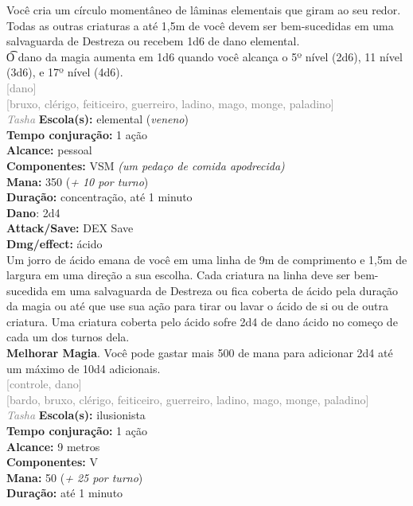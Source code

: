 \documentclass{RPG_Adventure}[2021/10/20]
\begin{document}
{\normalsize Você cria um círculo momentâneo de lâminas elementais que giram ao seu redor. Todas as outras criaturas a até 1,5m de você devem ser bem-sucedidas em uma salvaguarda de Destreza ou recebem 1d6 de dano elemental.\\\t O dano da magia aumenta em 1d6 quando você alcança o 5º nível (2d6), 11 nível (3d6), e 17º nível (4d6).\\}
{\scriptsize \textcolor{gray}{[dano]\\}}
{\scriptsize \textcolor{gray}{[bruxo, clérigo, feiticeiro, guerreiro, ladino, mago, monge, paladino]\\}}
{\tiny \textcolor{gray}{\textit{Tasha}}}
{\small \t \textbf{Escola(s):} elemental (\textit{veneno})\\\t \textbf{Tempo conjuração:} 1 ação\\\t \textbf{Alcance:} pessoal\\\t \textbf{Componentes:} VSM \textit{(um pedaço de comida apodrecida)}\\\t \textbf{Mana:} 350 (\textit{+ 10 por turno})\\\t \textbf{Duração:} concentração, até 1 minuto\\\t \textbf{Dano}: 2d4\\\t \textbf{Attack/Save:} DEX Save\\\t \textbf{Dmg/effect:} ácido\\}
{\normalsize Um jorro de ácido emana de você em uma linha de 9m de comprimento e 1,5m de largura em uma direção a sua escolha. Cada criatura na linha deve ser bem-sucedida em uma salvaguarda de Destreza ou fica coberta de ácido pela duração da magia ou até que use sua ação para tirar ou lavar o ácido de si ou de outra criatura. Uma criatura coberta pelo ácido sofre 2d4 de dano ácido no começo de cada um dos turnos dela.\\\t \textbf{Melhorar Magia}. Você pode gastar mais 500 de mana para adicionar 2d4 até um máximo de 10d4 adicionais.\\}
{\scriptsize \textcolor{gray}{[controle, dano]\\}}
{\scriptsize \textcolor{gray}{[bardo, bruxo, clérigo, feiticeiro, guerreiro, ladino, mago, monge, paladino]\\}}
{\tiny \textcolor{gray}{\textit{Tasha}}}
{\small \t \textbf{Escola(s):} ilusionista\\\t \textbf{Tempo conjuração:} 1 ação\\\t \textbf{Alcance:} 9 metros\\\t \textbf{Componentes:} V\\\t \textbf{Mana:} 50 (\textit{+ 25 por turno})\\\t \textbf{Duração:} até 1 minuto\\}
\end{document}
